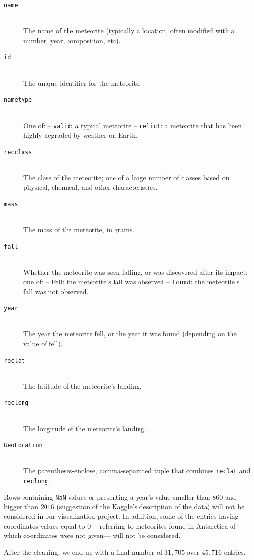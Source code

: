 \documentclass[10pt,conference,compsocconf]{IEEEtran}
\begin{document}
\begin{description}
\item[\texttt{name}] \ \\
  The name of the meteorite (typically a location, often modified with a number, year, composition, etc).
\item[\texttt{id}] \ \\
  The unique identifier for the meteorite.
\item[\texttt{nametype}] \ \\
  One of: -- \texttt{valid}: a typical meteorite -- \texttt{relict}: a meteorite that has been highly degraded by weather on Earth.
\item[\texttt{recclass}] \ \\
  The class of the meteorite; one of a large number of classes based on physical, chemical, and other characteristics.
\item[\texttt{mass}] \ \\
  The mass of the meteorite, in grams.
\item[\texttt{fall}] \ \\
   Whether the meteorite was seen falling, or was discovered after its impact; one of: -- Fell: the meteorite's fall was observed -- Found: the meteorite's fall was not observed.
\item[\texttt{year}] \ \\
  The year the meteorite fell, or the year it was found (depending on the value of fell).
\item[\texttt{reclat}] \ \\
  The latitude of the meteorite's landing.
\item[\texttt{reclong}] \ \\
  The longitude of the meteorite's landing.
\item[\texttt{GeoLocation}] \ \\
  The parentheses-enclose, comma-separated tuple that combines \texttt{reclat} and \texttt{reclong}.
\end{description}

Rows containing \texttt{NaN} values or presenting a year’s value smaller than $860$ and bigger than $2016$ (suggestion of the Kaggle’s description of the data) will not be considered in our visualization project. In addition, some of the entries having coordinates values equal to $0$ ---referring to meteorites found in Antarctica of which coordinates were not given--- will not be considered.

After the cleaning, we end up with a final number of $31,705$ over $45,716$ entries.
\end{document}
